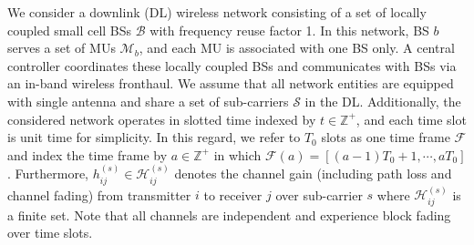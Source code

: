 \documentclass[conference]{IEEEtran}
\begin{document}
We consider a downlink (DL) wireless network consisting of a set of locally coupled small cell BSs $\mathcal{B}$ with frequency reuse factor 1. In this network, BS $b$ serves a set of MUs $\mathcal{M}_b$, and each MU is associated with one BS only.
 A central controller coordinates these locally coupled BSs and communicates with BSs via an in-band wireless fronthaul. We assume that all network entities are equipped with single antenna and share a set of sub-carriers $\mathcal{S}$ in the DL.
Additionally,  the considered network operates in slotted time indexed by $t\in\mathbb{Z}^{+}$, and  each time slot is unit time for simplicity. In this regard, we refer to $T_0$ slots as one time frame $\mathcal{F}$ and index the time frame by $a\in\mathbb{Z}^{+}$ in which $\mathcal{F}(a)=[(a-1)T_0+1,\cdots, aT_0]$.
Furthermore, $h_{ij}^{(s)}\in\mathcal{H}_{ij}^{(s)}$ denotes the channel gain (including path loss and channel fading) from transmitter  $i$ to receiver $j$ over sub-carrier $s$ where $\mathcal{H}_{ij}^{(s)}$ is a finite set.
Note that all channels are independent and experience block fading over time slots.
\end{document}
